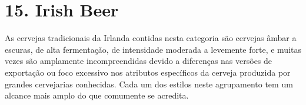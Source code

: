 \section*{15. Irish Beer}

As cervejas tradicionais da Irlanda contidas nesta categoria são cervejas âmbar a escuras, de alta fermentação, de intensidade moderada a levemente forte, e muitas vezes são amplamente incompreendidas devido a diferenças nas versões de exportação ou foco excessivo nos atributos específicos da cerveja produzida por grandes cervejarias conhecidas. Cada um dos estilos neste agrupamento tem um alcance mais amplo do que comumente se acredita.